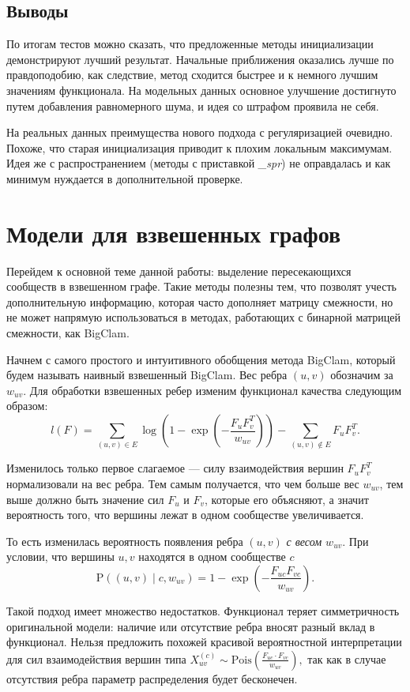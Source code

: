 \documentclass{ITaSconf}
\def\PP{\mathrm{P}}
\begin{document}
\subsection{Выводы} 
По итогам тестов можно сказать, что предложенные методы инициализации демонстрируют лучший результат. 
Начальные приближения оказались лучше по правдоподобию, как следствие, метод сходится быстрее и к немного лучшим значениям функционала. 
На модельных данных основное улучшение достигнуто путем добавления равномерного шума, и идея со штрафом проявила не себя.

На реальных данных преимущества нового подхода с регуляризацией очевидно. 
Похоже, что старая инициализация приводит к плохим локальным максимумам. 
Идея же с распространением (методы с приставкой \textit{\_spr}) не оправдалась и как минимум нуждается в дополнительной проверке.

\section{Модели для взвешенных графов}

Перейдем к основной теме данной работы: выделение пересекающихся сообществ в взвешенном графе. 
Такие методы полезны тем, что позволят учесть дополнительную информацию, которая часто дополняет матрицу смежности, но не может напрямую использоваться в методах, работающих с бинарной матрицей смежности, как BigClam.

Начнем с самого простого и интуитивного обобщения метода BigClam, который будем называть наивный взвешенный BigClam.
Вес ребра $(u,v)$ обозначим за $w_{uv}$. 
Для обработки взвешенных ребер изменим функционал качества следующим образом:
$$l(F) = \sum_{(u,v)\in E} \log\left(1 - \exp\left( - \dfrac{F_{u} F_{v}^T}{w_{uv}}\right)\right) - \sum_{(u,v) \notin E} F_{u} F_{v}^T.$$

Изменилось только первое слагаемое --- силу взаимодействия вершин $F_u F_v^T$ нормализовали на вес ребра.
Тем самым получается, что чем больше вес $w_{uv}$, тем выше должно быть значение сил $F_u$ и $F_v$, которые его объясняют, а значит вероятность того, что вершины лежат в одном сообществе увеличивается.

То есть изменилась вероятность появления ребра $(u,v)$ \textit{с весом $w_{uv}$}. При условии, что вершины $u,v$ находятся в одном сообществе $c$
$$\PP((u,v) \mid c, w_{uv})=1 - \exp\left(-\dfrac{F_{uc} F_{vc}}{w_{uv}}\right).$$

Такой подход имеет множество недостатков.
Функционал теряет симметричность оригинальной модели: наличие или отсутствие ребра вносят разный вклад в функционал. 
Нельзя предложить похожей красивой вероятностной интерпретации для сил взаимодействия вершин типа $ X_{uv}^{(c)} \sim \mathrm{Pois}\left(\frac{F_{uc} \cdot F_{vc}}{w_{uv}}\right),$
так как в случае отсутствия ребра параметр распределения будет бесконечен.
\end{document}
